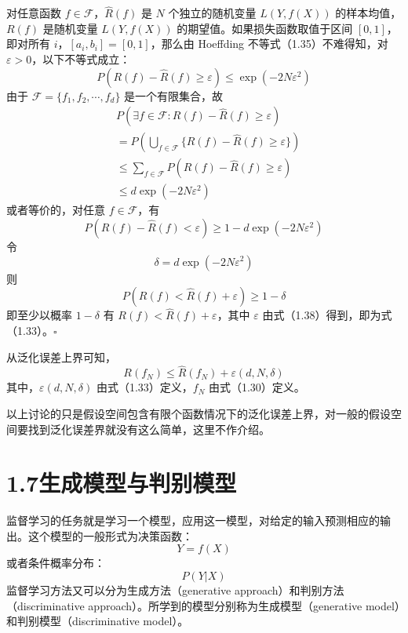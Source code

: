 \documentclass[UTF8,12pt,a4paper,fontset=fandol]{ctexart}
\begin{document}
对任意函数 $f\in\mathcal F$，$\hat R(f)$ 是 $N$ 个独立的随机变量 $L(Y,f(X))$ 的样本均值，$R(f)$ 是随机变量 $L(Y,f(X))$ 的期望值。如果损失函数取值于区间 $[0,1]$，即对所有 $i$，$[a_i,b_i]=[0,1]$，那么由 Hoeffding 不等式（1.35）不难得知，对 $\varepsilon>0$，以下不等式成立：
\begin{equation}
  P(R(f)-\hat R(f)\ge\varepsilon)\le\exp(-2N\varepsilon^2)
  \tag{1.36}
\end{equation}
由于 $\mathcal F=\{f_1,f_2,\cdots,f_d\}$ 是一个有限集合，故
\[
\begin{aligned}
  &P(\exists f\in\mathcal F:R(f)-\hat R(f)\ge\varepsilon)\\
  &=P\left(\bigcup_{f\in\mathcal F}\{R(f)-\hat R(f)\ge\varepsilon\}\right)\\
  &\le\sum_{f\in\mathcal F}P(R(f)-\hat R(f)\ge\varepsilon)\\
  &\le d\exp(-2N\varepsilon^2)
\end{aligned}
\]
或者等价的，对任意 $f\in\mathcal F$，有
\begin{equation}
  P(R(f)-\hat R(f)<\varepsilon)\ge1-d\exp(-2N\varepsilon^2)
  \tag{1.37}
\end{equation}
令
\begin{equation}
  \delta=d\exp(-2N\varepsilon^2)
  \tag{1.38}
\end{equation}
则
\[
  P(R(f)<\hat R(f)+\varepsilon)\ge1-\delta
\]
即至少以概率 $1-\delta$ 有 $R(f)<\hat R(f)+\varepsilon$，其中 $\varepsilon$ 由式（1.38）得到，即为式（1.33）。\hfill$\square$

从泛化误差上界可知，
\begin{equation}
  R(f_N)\le\hat R(f_N)+\varepsilon(d,N,\delta)
  \tag{1.39}
\end{equation}
其中，$\varepsilon(d,N,\delta)$ 由式（1.33）定义，$f_N$ 由式（1.30）定义。

以上讨论的只是假设空间包含有限个函数情况下的泛化误差上界，对一般的假设空间要找到泛化误差界就没有这么简单，这里不作介绍。

\section*{1.7\quad 生成模型与判别模型}

监督学习的任务就是学习一个模型，应用这一模型，对给定的输入预测相应的输出。这个模型的一般形式为决策函数：
\[
  Y=f(X)
\]
或者条件概率分布：
\[
  P(Y|X)
\]
监督学习方法又可以分为生成方法（generative approach）和判别方法（discriminative approach）。所学到的模型分别称为生成模型（generative model）和判别模型（discriminative model）。
\end{document}
